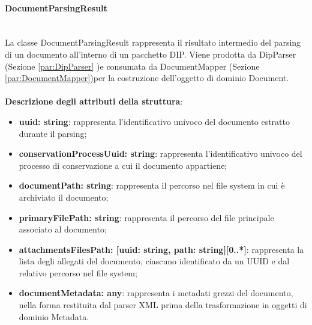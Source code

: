\documentclass[a4paper,12pt]{article}
\begin{document}
{{{                \paragraph{DocumentParsingResult}\label{par:DocumentParsingResult}\mbox{}\\
                La classe DocumentParsingResult rappresenta il risultato intermedio del parsing di un documento all'interno di un pacchetto DIP. Viene prodotta da DipParser (Sezione \ref{par:DipParser} )e consumata da DocumentMapper (Sezione \ref{par:DocumentMapper})per la costruzione dell'oggetto di dominio Document.\\
                \\
                \textbf{Descrizione degli attributi della struttura}:
                \begin{itemize}
                    \item \textbf{uuid: string}: rappresenta l'identificativo univoco del documento estratto durante il parsing;
                    \item \textbf{conservationProcessUuid: string}: rappresenta l'identificativo univoco del processo di conservazione a cui il documento appartiene;
                    \item \textbf{documentPath: string}: rappresenta il percorso nel file system in cui è archiviato il documento;
                    \item \textbf{primaryFilePath: string}: rappresenta il percorso del file principale associato al documento;
                    \item \textbf{attachmentsFilesPath: [uuid: string, path: string][0..*]}: rappresenta la lista degli allegati del documento, ciascuno identificato da un UUID e dal relativo percorso nel file system;
                    \item \textbf{documentMetadata: any}: rappresenta i metadati grezzi del documento, nella forma restituita dal parser XML prima della trasformazione in oggetti di dominio Metadata.
                \end{itemize}
}}}
\end{document}
